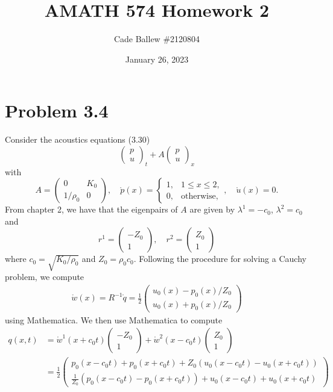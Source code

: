 \documentclass{article}
\title{AMATH 574 Homework 2}
\author{Cade Ballew \#2120804}
\date{January 26, 2023}
\begin{document}
	
\maketitle
	
\section{Problem 3.4}
Consider the acoustics equations (3.30) 
\[
\begin{pmatrix}
	p\\u
\end{pmatrix}_t+A\begin{pmatrix}
p\\u
\end{pmatrix}_x
\]
with
\[
A=\begin{pmatrix}
	0 &K_0\\1/\rho_0 &0
\end{pmatrix},\quad \mathring p(x)=\begin{cases}
1,&1\leq x\leq2,\\
0,&\text{otherwise},
\end{cases},\quad\mathring u(x)=0.
\]
From chapter 2, we have that the eigenpairs of $A$ are given by $\lambda^1=-c_0$, $\lambda^2=c_0$ and
\[
r^1=\begin{pmatrix}
	-Z_0\\1
\end{pmatrix},\quad r^2=\begin{pmatrix}
Z_0\\1
\end{pmatrix}
\]
where $c_0=\sqrt{K_0/\rho_0}$ and $Z_0=\rho_0c_0$. Following the procedure for solving a Cauchy problem, we compute
\begin{align*}
\mathring{w}(x)=R^{-1}\mathring{q}=\frac{1}{2}\begin{pmatrix}
	u_0(x)-p_0(x)/Z_0\\
	u_0(x)+p_0(x)/Z_0
\end{pmatrix}
\end{align*} 
using Mathematica. We then use Mathematica to compute 
\begin{align*}
q(x,t)&=\mathring{w}^1(x+c_0t)\begin{pmatrix}
	-Z_0\\1
\end{pmatrix}+\mathring{w}^2(x-c_0t)\begin{pmatrix}
	Z_0\\1
\end{pmatrix}\\&=
\frac{1}{2}\begin{pmatrix}
p_0(x-c_0t)+p_0(x+c_0t)+Z_0(u_0(x-c_0t)-u_0(x+c_0t))\\
\frac{1}{Z_0}(p_0(x-c_0t)-p_0(x+c_0t))+u_0(x-c_0t)+u_0(x+c_0t)
\end{pmatrix}
\end{align*}
\end{document}
